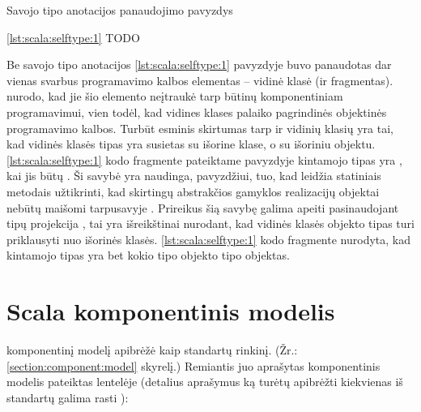 \begin{scalacodelisting}
  \caption{Savojo tipo anotacijos panaudojimo pavyzdys}
  \label{lst:scala:selftype:1}
\end{scalacodelisting}

\begin{scalainterpreterlisting}
  \caption{\ref{lst:scala:selftype:1} TODO}
  \label{lst:scala:selftype:2}
\end{scalainterpreterlisting}

Be savojo tipo anotacijos \ref{lst:scala:selftype:1} pavyzdyje buvo
panaudotas dar vienas svarbus programavimo kalbos elementas – vidinė
klasė (ir fragmentas). \cite[12]{scalable-component-abstractions}
nurodo, kad jie šio elemento neįtraukė tarp būtinų komponentiniam
programavimui, vien todėl, kad vidines klases palaiko pagrindinės
 objektinės programavimo kalbos. Turbūt esminis
skirtumas tarp  ir  vidinių klasių
yra tai, kad
 vidinės klasės tipas yra susietas su išorine klase,
o  su išoriniu objektu. \ref{lst:scala:selftype:1}
kodo fragmente pateiktame pavyzdyje kintamojo  tipas
yra , kai  jis būtų
. Ši savybė yra naudinga, pavyzdžiui, tuo, kad 
leidžia statiniais metodais užtikrinti, kad skirtingų abstrakčios
gamyklos  realizacijų objektai nebūtų maišomi
tarpusavyje \cite[36]{scala-design-patterns}. Prireikus šią savybę
galima apeiti pasinaudojant tipų projekcija ,
tai yra išreikštinai nurodant, kad vidinės klasės objekto tipas
turi priklausyti nuo išorinės klasės. \ref{lst:scala:selftype:1}
kodo fragmente nurodyta, kad kintamojo  tipas yra
bet kokio  tipo objekto  tipo objektas.

\section{Scala komponentinis modelis}

\cite[37]{heineman2001component} komponentinį modelį apibrėžė kaip
standartų rinkinį. (Žr.: \ref{section:component:model} skyrelį.)
Remiantis juo aprašytas  komponentinis modelis
pateiktas lentelėje (detalius aprašymus ką turėtų apibrėžti
kiekvienas iš standartų galima rasti
\cite[38-44]{heineman2001component}):

